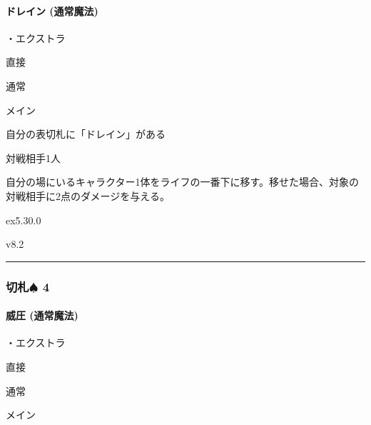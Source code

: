 \documentclass[letterpaper,10pt,dvipdfmx]{sphinxmanual}
\begin{document}
\paragraph{ドレイン (通常魔法)}
\label{\detokenize{auto/frameActionlist:act-drain}}\label{\detokenize{auto/frameActionlist:id19}}
\sphinxAtStartPar
{}

\sphinxAtStartPar
・エクストラ

\sphinxAtStartPar
{} 直接

\sphinxAtStartPar
{} 通常

\sphinxAtStartPar
{} メイン

\sphinxAtStartPar
{}

\sphinxAtStartPar
自分の表切札に「ドレイン」がある

\sphinxAtStartPar
{}

\sphinxAtStartPar
対戦相手1人

\sphinxAtStartPar
{}

\sphinxAtStartPar
自分の場にいるキャラクター1体をライフの一番下に移す。移せた場合、対象の対戦相手に2点のダメージを与える。

\sphinxAtStartPar
{}  ex5.30.0

\sphinxAtStartPar
{}  v8.2


\bigskip\hrule\bigskip



\subsubsection{切札{\normalsize $\spadesuit$} 4}
\label{\detokenize{auto/frameActionlist:id20}}

\paragraph{威圧 (通常魔法)}
\label{\detokenize{auto/frameActionlist:act-intimidate}}\label{\detokenize{auto/frameActionlist:id21}}
\sphinxAtStartPar
{}

\sphinxAtStartPar
・エクストラ

\sphinxAtStartPar
{} 直接

\sphinxAtStartPar
{} 通常

\sphinxAtStartPar
{} メイン
\end{document}
